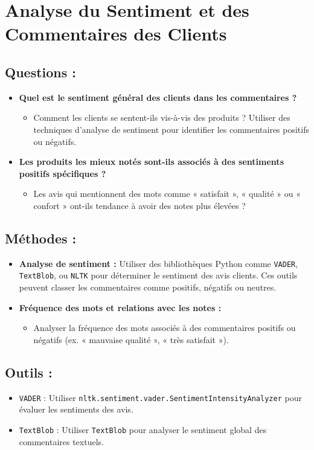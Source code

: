 \documentclass{article}
\begin{document}
	\section{Analyse du Sentiment et des Commentaires des Clients}
	
	\subsection{Questions :}
	\begin{itemize}
		\item \textbf{Quel est le sentiment général des clients dans les commentaires ?}
		\begin{itemize}
			\item Comment les clients se sentent-ils vis-à-vis des produits ? Utiliser des techniques d'analyse de sentiment pour identifier les commentaires positifs ou négatifs.
		\end{itemize}
		
		\item \textbf{Les produits les mieux notés sont-ils associés à des sentiments positifs spécifiques ?}
		\begin{itemize}
			\item Les avis qui mentionnent des mots comme « satisfait », « qualité » ou « confort » ont-ils tendance à avoir des notes plus élevées ?
		\end{itemize}
	\end{itemize}
	
	\subsection{Méthodes :}
	\begin{itemize}
		\item \textbf{Analyse de sentiment :} Utiliser des bibliothèques Python comme \texttt{VADER}, \texttt{TextBlob}, ou \texttt{NLTK} pour déterminer le sentiment des avis clients. Ces outils peuvent classer les commentaires comme positifs, négatifs ou neutres.
		\item \textbf{Fréquence des mots et relations avec les notes :}
		\begin{itemize}
			\item Analyser la fréquence des mots associés à des commentaires positifs ou négatifs (ex. « mauvaise qualité », « très satisfait »).
		\end{itemize}
	\end{itemize}
	
	\subsection{Outils :}
	\begin{itemize}
		\item \texttt{VADER} : Utiliser \texttt{nltk.sentiment.vader.SentimentIntensityAnalyzer} pour évaluer les sentiments des avis.
		\item \texttt{TextBlob} : Utiliser \texttt{TextBlob} pour analyser le sentiment global des commentaires textuels.
	\end{itemize}
	
\end{document}
